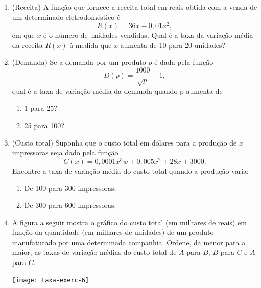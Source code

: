 \begin{enumerate}
    \item (Receita) A função que fornece a receita total em reais obtida com a venda de um determinado eletrodoméstico é
\[ R(x) = 36x - 0,01x^2,\]
em que $x$ é o número de unidades vendidas. Qual é a taxa da variação média da receita $R(x)$ à medida que $x$ aumenta de 10 para 20 unidades?

\item (Demanda) Se a demanda por um produto $p$ é dada pela função 
\[D(p) = \dfrac{1000}{\sqrt{p}} - 1, \]
  qual é a taxa de variação média da demanda quando p aumenta de

  \begin{enumerate}
  \item 1 para 25?
  \item 25 para 100?
  \end{enumerate}

\item (Custo total) Suponha que o custo total em dólares para a produção de $x$ impressoras seja dado pela função
  \[C(x) = 0,0001x^3 w + 0,005x^2 + 28x + 3000.\]
  Encontre a taxa de variação média do custo total quando a produção varia:
  \begin{enumerate}
  \item De 100 para 300 impressoras;
  \item De 300 para 600 impressoras.
  \end{enumerate}

\clearpage

\item A figura a seguir mostra o gráfico do custo total (em milhares de reais) em função da quantidade (em milhares de unidades) de um produto manufaturado por uma determinada companhia. Ordene, da menor para a maior, as taxas de variação médias do custo total de $A$ para $B$, $B$ para $C$ e $A$ para $C$.

  \begin{center}
\texttt{[image: taxa-exerc-6]}
  \end{center}


\end{enumerate}
